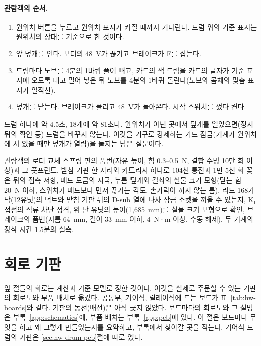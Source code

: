 \paragraph{관람객의 순서.}
\begin{enumerate}
\item 원위치 버튼을 누르고 원위치 표시가 켜질 때까지 기다린다. 드럼 위의 기준 표시는 원위치의 상태를 기준으로 한 것이다.
\item 앞 덮개를 연다. 모터의 48~V가 끊기고 브레이크가 F를 잡는다.
\item 드럼마다 노브를 4분의 1바퀴 풀어 빼고, 카드의 색 드럼을 카드의 글자가 기준 표시에 오도록 대고 밀어 넣은 뒤
노브를 4분의 1바퀴 돌린다(노브와 몸체의 맞춤 표시가 일직선).
\item 덮개를 닫는다. 브레이크가 풀리고 48~V가 돌아온다. 시작 스위치를 껐다 켠다.
\end{enumerate}
드럼 하나에 약 4.5초, 18개에 약 81초다. 원위치가 아닌 곳에서 덮개를 열었으면(정지 뒤의 확인 등) 드럼을 바꾸지
않는다. 이것을 기구로 강제하는 가드 잠금(기계가 원위치에 서 있을 때만 덮개가 열림)을 둘지는 남은 질문이다.

\begin{todobox}{관람객의 로터 교체}
스프링 핀의 품번(자유 높이, 힘 0.3--0.5~N, 결합 수명 10만 회 이상)과 그 풋프린트, 받침 기판 한 자리와 카트리지
하나로 104선 통전과 1만 5천 회 꽂은 뒤의 접촉 저항, 패드 도금의 자국, 누름 덮개와 걸쇠의 실물 크기 모형(닫는 힘
20~N 이하, 스위치가 패드보다 먼저 끊기는 각도, 손가락이 끼지 않는 틈), 리드 168가닥(12유닛)의 덕트와 받침 기판 뒤의
D-sub 열에 나사 잠금 소켓을 끼울 수 있는지, K$_\mathrm{I}$ 접점의 직류 차단 정격, 위 단 유닛의 높이(1,685~mm)를
실물 크기 모형으로 확인, 브레이크의 품번(지름 64~mm, 길이 33~mm 이하, 4~N·m 이상, 수동 해제), 두 기계의 장착
시간 1.5분의 실측.
\end{todobox}

\section{회로 기판}\label{sec:hw-boards}

앞 절들의 회로는 계산과 기준 모델로 정한 것이다. 이것을 실제로 주문할 수 있는 기판의 회로도와 부품 배치로 옮겼다.
공통부, 기어식, 릴레이식에 드는 보드가 표~\ref{tab:hw-boards}와 같다. 기판의 동선(배선)은 아직 긋지 않았다. 보드마다의
회로도와 그 설명은 부록~\ref{app:schematics}에, 부품 배치는 부록~\ref{app:pcb}에 있다. 이 절은 보드마다 무엇을 하고
왜 그렇게 만들었는지를 요약하고, 부록에서 찾아갈 곳을 적는다. 기어식 드럼의 기판은 \ref{sec:hw-drum-pcb}절에 따로 있다.

